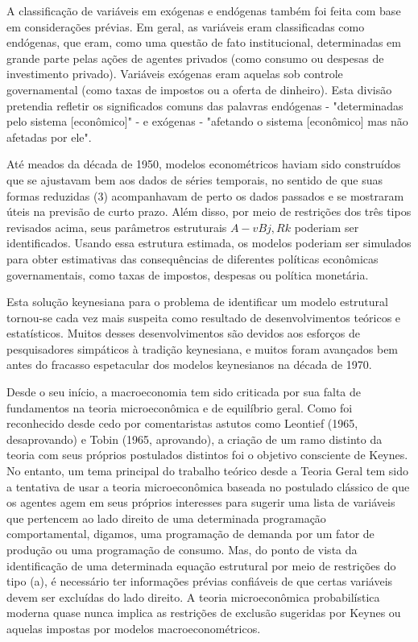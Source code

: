 \documentclass[a4paper,12pt]{article}[abntex2]
\begin{document}
A classificação de variáveis em exógenas e endógenas também foi feita com base em considerações prévias. Em geral, as variáveis eram classificadas como endógenas, que eram, como uma questão de fato institucional, determinadas em grande parte pelas ações de agentes privados (como consumo ou despesas de investimento privado). Variáveis exógenas eram aquelas sob controle governamental (como taxas de impostos ou a oferta de dinheiro). Esta divisão pretendia refletir os significados comuns das palavras endógenas - "determinadas pelo sistema [econômico]" - e exógenas - "afetando o sistema [econômico] mas não afetadas por ele".

Até meados da década de 1950, modelos econométricos haviam sido construídos que se ajustavam bem aos dados de séries temporais, no sentido de que suas formas reduzidas (3) acompanhavam de perto os dados passados e se mostraram úteis na previsão de curto prazo. Além disso, por meio de restrições dos três tipos revisados acima, seus parâmetros estruturais $A-v Bj, Rk$ poderiam ser identificados. Usando essa estrutura estimada, os modelos poderiam ser simulados para obter estimativas das consequências de diferentes políticas econômicas governamentais, como taxas de impostos, despesas ou política monetária.

Esta solução keynesiana para o problema de identificar um modelo estrutural tornou-se cada vez mais suspeita como resultado de desenvolvimentos teóricos e estatísticos. Muitos desses desenvolvimentos são devidos aos esforços de pesquisadores simpáticos à tradição keynesiana, e muitos foram avançados bem antes do fracasso espetacular dos modelos keynesianos na década de 1970.

Desde o seu início, a macroeconomia tem sido criticada por sua falta de fundamentos na teoria microeconômica e de equilíbrio geral. Como foi reconhecido desde cedo por comentaristas astutos como Leontief (1965, desaprovando) e Tobin (1965, aprovando), a criação de um ramo distinto da teoria com seus próprios postulados distintos foi o objetivo consciente de Keynes. No entanto, um tema principal do trabalho teórico desde a Teoria Geral tem sido a tentativa de usar a teoria microeconômica baseada no postulado clássico de que os agentes agem em seus próprios interesses para sugerir uma lista de variáveis que pertencem ao lado direito de uma determinada programação comportamental, digamos, uma programação de demanda por um fator de produção ou uma programação de consumo. Mas, do ponto de vista da identificação de uma determinada equação estrutural por meio de restrições do tipo (a), é necessário ter informações prévias confiáveis de que certas variáveis devem ser excluídas do lado direito. A teoria microeconômica probabilística moderna quase nunca implica as restrições de exclusão sugeridas por Keynes ou aquelas impostas por modelos macroeconométricos.
\end{document}
